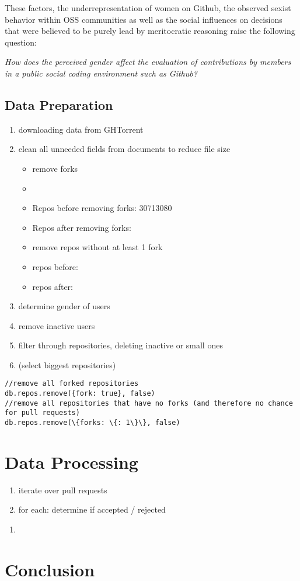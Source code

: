 These factors, the underrepresentation of women on Github, the observed sexist behavior within \ac{OSS} communities as well as the social influences on decisions that were believed to be purely lead by meritocratic reasoning raise the following question:

\emph{How does the perceived gender affect the evaluation of contributions by members in a public social coding environment such as Github?}


 \citeauthor{Tsay:2014:IST:2568225.2568315}

\subsection{Data Preparation}

\begin{enumerate}
	\item downloading data from GHTorrent
	\item clean all unneeded fields from documents to reduce file size
	\begin{itemize}
		\item remove forks \cite{Gousios:2014:ESP:2568225.2568260}
		\item
		\item Repos before removing forks: 30713080
		\item Repos after removing forks:
		\item remove repos without at least 1 fork
		\item repos before:
		\item repos after:
	\end{itemize}
	\item determine gender of users
	\item remove inactive users
	\item filter through repositories, deleting inactive or small ones \cite{Gousios:2014:ESP:2568225.2568260}
	\item (select biggest repositories)
\end{enumerate}


\begin{lstlisting}
//remove all forked repositories
db.repos.remove({fork: true}, false)
//remove all repositories that have no forks (and therefore no chance for pull requests)
db.repos.remove(\{forks: \{: 1\}\}, false)
\end{lstlisting}

\section{Data Processing} %
\label{sec:data_processing}


\begin{enumerate}
	\item iterate over pull requests
	\item for each: determine if accepted / rejected
\end{enumerate}


\begin{enumerate}
	\item
\end{enumerate}


\section{Conclusion}\label{Conclusion}
